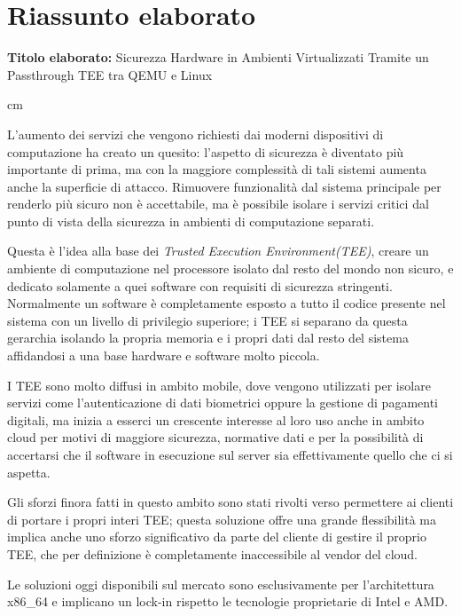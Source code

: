 \documentclass[12pt,italian]{report}
\begin{document}
\chapter*{Riassunto elaborato}


\textbf{Titolo elaborato:} Sicurezza Hardware in Ambienti Virtualizzati Tramite un Passthrough TEE tra QEMU e Linux

 cm

L'aumento dei servizi che vengono richiesti dai moderni dispositivi di
computazione ha creato un quesito: l'aspetto di sicurezza è diventato più
importante di prima, ma con la maggiore complessità di tali sistemi aumenta
anche la superficie di attacco.
Rimuovere funzionalità dal sistema principale per renderlo più sicuro non
è accettabile, ma è possibile isolare i servizi critici dal punto di vista
della sicurezza in ambienti di computazione separati.

Questa è l'idea alla base dei \textit{Trusted Execution Environment(TEE)},
creare un ambiente di computazione nel processore isolato dal resto del
mondo non sicuro\cite{sabt2015tee}, e dedicato solamente a quei software
con requisiti di sicurezza stringenti.
Normalmente un software è completamente esposto a tutto il codice
presente nel sistema con un livello di privilegio superiore;
i TEE si separano da questa gerarchia isolando la propria memoria e i propri
dati dal resto del sistema affidandosi a una base hardware e software
molto piccola.

I TEE sono molto diffusi in ambito mobile, dove vengono utilizzati per
isolare servizi come l'autenticazione di dati biometrici\cite{androidbiometrics}
oppure la gestione di pagamenti digitali\cite{secure_payments}, ma inizia a esserci
un crescente interesse al loro
uso anche in ambito cloud\cite{confidential_computing_consortium} per
motivi di maggiore sicurezza,
normative dati e per la possibilità di accertarsi che il software
in esecuzione sul server sia effettivamente quello che ci si aspetta.

Gli sforzi finora fatti in questo ambito sono stati rivolti verso permettere
ai clienti di portare i propri interi TEE; questa soluzione offre una grande
flessibilità ma implica anche uno sforzo significativo da parte del cliente
di gestire il proprio TEE, che per definizione è completamente inaccessibile
al vendor del cloud.

Le soluzioni oggi disponibili sul mercato sono esclusivamente per
l'architettura x86\_64 e implicano un lock-in rispetto le tecnologie
proprietarie di Intel e AMD.
\end{document}
